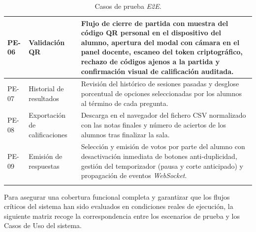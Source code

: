 \begin{table}[H]
{\begin{tabularx}{1.1\textwidth}{l P{3cm} Y}
      \hline
      PE-06\label{pe:06} & Validación QR & Flujo de cierre de partida con muestra del código QR personal en el dispositivo del alumno, apertura del modal con cámara en el panel docente, escaneo del token criptográfico, rechazo de códigos ajenos a la partida y confirmación visual de calificación auditada. \\
      \hline
      PE-07\label{pe:07} & Historial de resultados & Revisión del histórico de sesiones pasadas y desglose porcentual de opciones seleccionadas por los alumnos al término de cada pregunta. \\
      \hline
      PE-08\label{pe:08} & Exportación de calificaciones & Descarga en el navegador del fichero CSV normalizado con las notas finales y número de aciertos de los alumnos tras finalizar la sala. \\
      \hline
      PE-09\label{pe:09} & Emisión de respuestas & Selección y emisión de votos por parte del alumno con desactivación inmediata de botones anti-duplicidad, gestión del temporizador (pausa y corte anticipado) y propagación de eventos \textit{WebSocket}. \\
      \bighline
    \end{tabularx}%
  }
  \caption{Casos de prueba \textit{E2E}.}
  \label{tab:casos_prueba_e2e}
\end{table}

Para asegurar una cobertura funcional completa y garantizar que los flujos críticos del sistema han sido evaluados en condiciones reales de ejecución, la siguiente matriz recoge la correspondencia entre los escenarios de prueba y los Casos de Uso del sistema.

